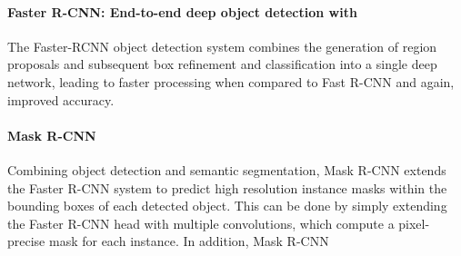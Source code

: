 \paragraph{Faster R-CNN: End-to-end deep object detection with }
The Faster-RCNN object detection system combines the generation of region proposals and subsequent box refinement and
classification into a single deep network, leading to faster processing when compared to Fast R-CNN
and again, improved accuracy.


\paragraph{Mask R-CNN}

Combining object detection and semantic segmentation, Mask R-CNN extends the Faster R-CNN system to predict
high resolution instance masks within the bounding boxes of each detected object.
This can be done by simply extending the Faster R-CNN head with multiple convolutions, which
compute a pixel-precise mask for each instance.
In addition, Mask R-CNN
